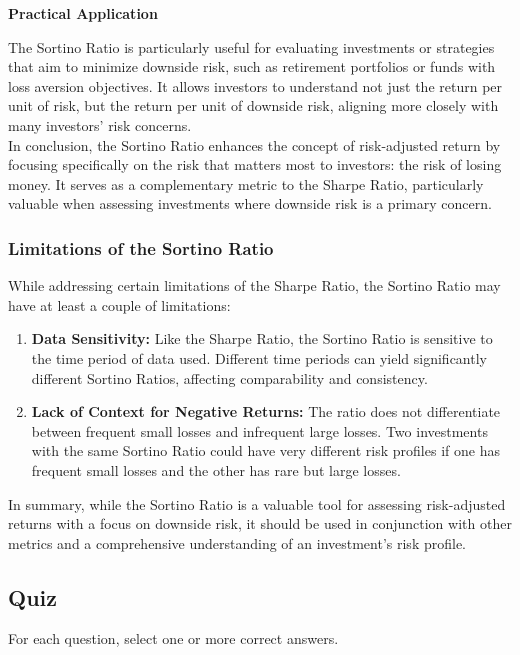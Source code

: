 \documentclass{article}
\begin{document}
\textbf{Practical Application}

The Sortino Ratio is particularly useful for evaluating investments or strategies that aim to minimize downside risk, such as retirement portfolios or funds with loss aversion objectives. It allows investors to understand not just the return per unit of risk, but the return per unit of downside risk, aligning more closely with many investors' risk concerns. \\

In conclusion, the Sortino Ratio enhances the concept of risk-adjusted return by focusing specifically on the risk that matters most to investors: the risk of losing money. It serves as a complementary metric to the Sharpe Ratio, particularly valuable when assessing investments where downside risk is a primary concern.

\subsubsection{Limitations of the Sortino Ratio}

While addressing certain limitations of the Sharpe Ratio, the Sortino Ratio may have at least a couple of limitations:

\begin{enumerate}
    
    \item \textbf{Data Sensitivity:} Like the Sharpe Ratio, the Sortino Ratio is sensitive to the time period of data used. Different time periods can yield significantly different Sortino Ratios, affecting comparability and consistency.
    
    \item \textbf{Lack of Context for Negative Returns:} The ratio does not differentiate between frequent small losses and infrequent large losses. Two investments with the same Sortino Ratio could have very different risk profiles if one has frequent small losses and the other has rare but large losses.

\end{enumerate}

In summary, while the Sortino Ratio is a valuable tool for assessing risk-adjusted returns with a focus on downside risk, it should be used in conjunction with other metrics and a comprehensive understanding of an investment's risk profile.

\subsection{Quiz}
For each question, select one or more correct answers.
\end{document}
